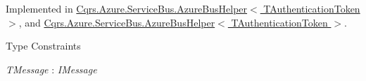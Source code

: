 Implemented in \hyperlink{classCqrs_1_1Azure_1_1ServiceBus_1_1AzureBusHelper_a3b8dd8410756ffdc67782dde8f2519ff_a3b8dd8410756ffdc67782dde8f2519ff}{Cqrs.\+Azure.\+Service\+Bus.\+Azure\+Bus\+Helper$<$ T\+Authentication\+Token $>$}, and \hyperlink{classCqrs_1_1Azure_1_1ServiceBus_1_1AzureBusHelper_a3b8dd8410756ffdc67782dde8f2519ff_a3b8dd8410756ffdc67782dde8f2519ff}{Cqrs.\+Azure.\+Service\+Bus.\+Azure\+Bus\+Helper$<$ T\+Authentication\+Token $>$}.

\begin{Desc}
\item[Type Constraints]\begin{description}
\item[{\em T\+Message} : {\em I\+Message}]\end{description}
\end{Desc}
